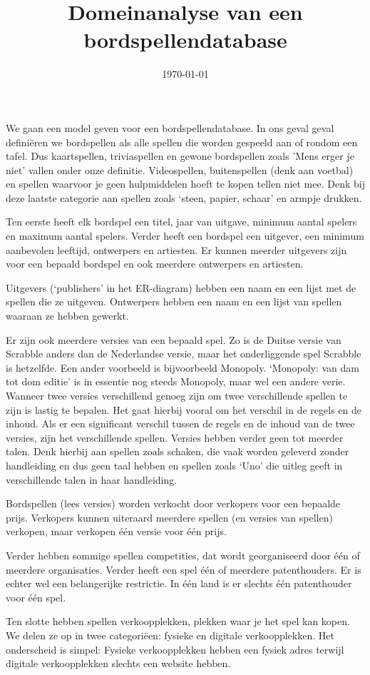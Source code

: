 \documentclass[a4paper, dutch, parskip=full]{scrartcl}
\begin{document}
\title{Domeinanalyse van een bordspellendatabase}
\author{}
\date{\today}
\maketitle
We gaan een model geven voor een bordspellendatabase.
In ons geval geval defini\"{e}ren we bordspellen als alle spellen die worden gespeeld aan of rondom een
tafel.
Dus kaartspellen, triviaspellen en gewone bordspellen zoals 'Mens erger je niet' vallen onder onze
definitie.
Videospellen, buitenspellen (denk aan voetbal) en spellen waarvoor je geen hulpmiddelen hoeft te kopen tellen niet mee.
Denk bij deze laatste categorie aan spellen zoals `steen, papier, schaar' en armpje drukken.

Ten eerste heeft elk bordspel een titel, jaar van uitgave, minimum aantal spelers en maximum aantal
spelers.
Verder heeft een bordspel een uitgever, een minimum aanbevolen leeftijd, ontwerpers en artiesten.
Er kunnen meerder uitgevers zijn voor een bepaald bordspel en ook meerdere ontwerpers en artiesten.

Uitgevers (`publishers' in het ER-diagram) hebben een naam en een lijst met de spellen die ze uitgeven.
Ontwerpers hebben een naam en een lijst van spellen waaraan ze hebben gewerkt.

Er zijn ook meerdere versies van een bepaald spel.
Zo is de Duitse versie van Scrabble anders dan de Nederlandse versie, maar het onderliggende spel
Scrabble is hetzelfde.
Een ander voorbeeld is bijvoorbeeld Monopoly.
`Monopoly: van dam tot dom editie' is in essentie nog steeds Monopoly, maar wel een andere verie.
Wanneer twee versies verschillend genoeg zijn om twee verschillende spellen te zijn is lastig te bepalen.
Het gaat hierbij vooral om het verschil in de regels en de inhoud.
Als er een significant verschil tussen de regels en de inhoud van de twee versies, zijn het verschillende spellen.
Versies hebben verder geen tot meerder talen.
Denk hierbij aan spellen zoals schaken, die vaak worden geleverd zonder handleiding en dus geen taal hebben en spellen zoals `Uno' die uitleg geeft in verschillende talen in haar handleiding.

Bordspellen (lees versies) worden verkocht door verkopers voor een bepaalde prijs.
Verkopers kunnen uiteraard meerdere spellen (en versies van spellen) verkopen, maar verkopen
\'{e}\'{e}n versie voor \'{e}\'{e}n prijs.

Verder hebben sommige spellen competities, dat wordt georganiseerd door \'{e}\'{e}n of meerdere organisaties.
Verder heeft een spel \'{e}\'{e}n of meerdere patenthouders.
Er is echter wel een belangerijke restrictie.
In \'{e}\'{e}n land is er slechts \'{e}\'{e}n patenthouder voor \'{e}\'{e}n spel.

Ten slotte hebben spellen verkoopplekken, plekken waar je het spel kan kopen.
We delen ze op in twee categori\"{e}en: fysieke en digitale verkoopplekken.
Het onderscheid is simpel:
Fysieke verkoopplekken hebben een fysiek adres terwijl digitale verkoopplekken slechts een website hebben.
\end{document}
